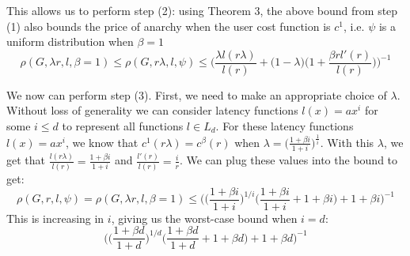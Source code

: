 \begin{proof-sketch}
    This allows us to perform step (2): using Theorem 3, the above bound from step (1) also bounds the price of anarchy when the user cost function is $c^1$, i.e. $\psi$ is a uniform distribution when $\beta = 1$
    $$\rho(G,\lambda r,l,\beta=1) \le \rho(G,r\lambda, l, \psi) \le \Big(\frac{\lambda l(r\lambda)}{l(r)} + \Big(1-\lambda\Big)\Big(1+\frac{\beta rl'(r)}{l(r)}\Big)\Big)^{-1}$$

    We now can perform step (3). First, we need to make an appropriate choice of $\lambda$. Without loss of generality we can consider latency functions $l(x) = ax^i$ for some $i \le d$ to represent all functions $l \in L_d$. For these latency functions $l(x) = ax^i$, we know that 
    $c^1(r\lambda) = c^\beta(r)$ when $\lambda = \Big(\frac{1+\beta i}{1+i}\Big)^{\frac{1}{i}}$.
    With this $\lambda$, we get that $\frac{l(r\lambda)}{l(r)} = \frac{1+\beta i}{1+i}$ and $\frac{l'(r)}{l(r)} = \frac{i}{r}$. We can plug these values into the bound to get:
    $$\rho(G,r,l,\psi) = \rho(G,\lambda r, l,\beta=1) \le \Big(\Big(\frac{1+\beta i}{1+i}\Big)^{1/i}\Big(\frac{1+\beta i}{1+i} + 1 + \beta i\Big)+ 1 + \beta i\Big)^{-1}$$
    This is increasing in $i$, giving us the worst-case bound when $i=d$:
$$\Big(\Big(\frac{1+\beta d}{1+d}\Big)^{1/d}\Big(\frac{1+\beta d}{1+d} + 1 + \beta d\Big)+ 1 + \beta d\Big)^{-1}$$
\end{proof-sketch}

